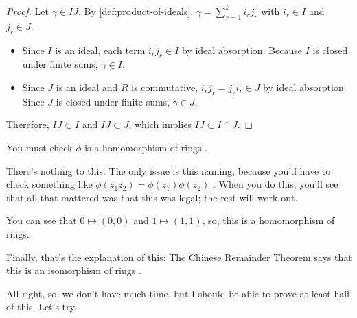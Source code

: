 \begin{content}

\begin{proof}
Let $\gamma \in IJ$. By \cref{def:product-of-ideals}, $\gamma = \sum_{r=1}^k i_r j_r$ with $i_r \in I$ and $j_r \in J$.
\begin{itemize}
    \item Since $I$ is an ideal, each term $i_r j_r \in I$ by ideal absorption. Because $I$ is closed under finite sums, $\gamma \in I$.
    \item Since $J$ is an ideal and $R$ is commutative, $i_r j_r = j_r i_r \in J$ by ideal absorption. Since $J$ is closed under finite sums, $\gamma \in J$.
\end{itemize}
Therefore, $IJ \subset I$ and $IJ \subset J$, which implies $IJ \subset I \cap J$.
\end{proof}
\end{content}

\begin{speech}[01:26:33 - 01:27:32]
You must check $\phi$ is a homomorphism of rings .

There's nothing to this. The only issue is this naming, because you'd have to check something like $\phi(\bar{z}_1 \bar{z}_2) = \phi(\bar{z}_1) \phi(\bar{z}_2)$ . When you do this, you'll see that all that mattered was that this was legal; the rest will work out.

You can see that $0 \mapsto (0, 0)$ and $1 \mapsto (1, 1)$, so, this is a homomorphism of rings.

Finally, that's the explanation of this: The Chinese Remainder Theorem says that this is an isomorphism of rings .

All right, so, we don't have much time, but I should be able to prove at least half of this. Let's try.
\end{speech}

